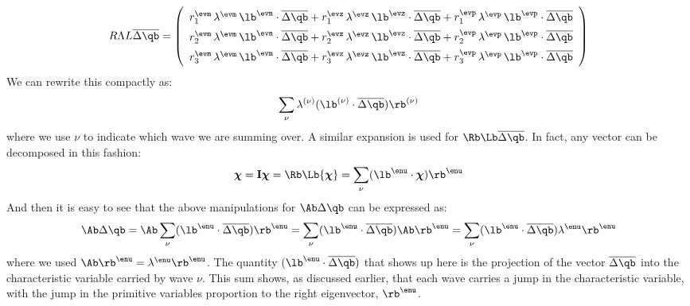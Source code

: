 \begin{equation}
\renewcommand{\arraystretch}{1.5}
R\Lambda L \overline{\Delta \qb} =
   \left ( \begin{array}{c}
            r_1^\evm \, \lambda^\evm \, \lb^\evm \cdot \overline{\Delta \qb} +
            r_1^\evz \, \lambda^\evz \, \lb^\evz \cdot \overline{\Delta \qb} +
            r_1^\evp \, \lambda^\evp \, \lb^\evp \cdot \overline{\Delta \qb} \\
%
            r_2^\evm \, \lambda^\evm \, \lb^\evm \cdot \overline{\Delta \qb} +
            r_2^\evz \, \lambda^\evz \, \lb^\evz \cdot \overline{\Delta \qb} +
            r_2^\evp \, \lambda^\evp \, \lb^\evp \cdot \overline{\Delta \qb} \\
%
            r_3^\evm \, \lambda^\evm \, \lb^\evm \cdot \overline{\Delta \qb} +
            r_3^\evz \, \lambda^\evz \, \lb^\evz \cdot \overline{\Delta \qb} +
            r_3^\evp \, \lambda^\evp \, \lb^\evp \cdot \overline{\Delta \qb} \\
   \end{array} \right )
\renewcommand{\arraystretch}{1.0}
\end{equation}
We can rewrite this compactly as:
\begin{equation}
\sum_\nu \lambda^{(\nu)} (\lb^{(\nu)} \cdot \overline{\Delta \qb}) \rb^{(\nu)}
\end{equation}
where we use $\nu$ to indicate which wave we are summing over.  A similar
expansion is used for $\Rb\Lb \overline{\Delta \qb}$.  In fact, any vector
can be decomposed in this fashion:
\begin{equation}
{\boldsymbol{\chi}} = {\bf I} {\boldsymbol{\chi}} = \Rb \Lb {\boldsymbol{\chi}} =
   \sum_\nu (\lb^\enu \cdot {\boldsymbol{\chi}}) \rb^\enu
\end{equation}
And then it is easy to see that the above manipulations for $\Ab \Delta \qb$
can be expressed as:
\begin{equation}
\Ab \Delta \qb =  \Ab \sum_\nu (\lb^\enu \cdot \overline{\Delta \qb}) \rb^\enu =
  \sum_\nu (\lb^\enu \cdot \overline{\Delta \qb}) \Ab \rb^\enu =
  \sum_\nu (\lb^\enu \cdot \overline{\Delta \qb}) \lambda^\enu \rb^\enu
\end{equation}
where we used $\Ab \rb^\enu = \lambda^\enu \rb^\enu$.  The quantity $(\lb^\enu
\cdot \overline{\Delta \qb})$ that shows up here is the projection of
the vector $\overline{\Delta \qb}$ into the characteristic variable
carried by wave $\nu$.  This sum shows, as discussed earlier, that each wave
carries a jump in the characteristic variable, with the jump in the primitive
variables proportion to the right eigenvector, $\rb^\enu$.

